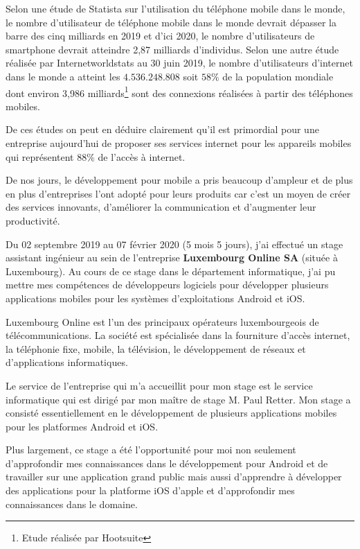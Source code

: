 	Selon une étude de Statista sur l'utilisation du téléphone mobile dans le monde, le nombre d'utilisateur de téléphone mobile dans le monde devrait dépasser la barre des cinq milliards en 2019 et d'ici 2020, le nombre d'utilisateurs de smartphone devrait atteindre 2,87 milliards d'individus. Selon une autre étude réalisée par \og Internetworldstats \fg{,}  au 30 juin 2019, le nombre d'utilisateurs d'internet dans le monde a atteint les $4.536.248.808$ soit $58 \% $ de la population mondiale dont environ 3,986 milliards\footnote{Etude réalisée par Hootsuite} sont des connexions réalisées à partir des téléphones mobiles.
	
	De ces études on peut en déduire clairement qu'il est primordial pour une entreprise aujourd'hui de proposer ses services internet pour les appareils mobiles  qui  représentent $88\% $ de l'accès à internet. 
	
	De nos jours, le développement pour mobile a pris beaucoup d'ampleur  et de plus en plus d'entreprises l'ont adopté pour leurs produits car c'est un moyen de créer des services innovants, d'améliorer la communication et d'augmenter leur productivité.
	
	Du 02 septembre 2019 au 07 février 2020 (5 mois 5 jours), j'ai effectué un stage assistant ingénieur au sein de l'entreprise \textbf{Luxembourg Online SA} (située à Luxembourg). Au cours de ce stage dans le département informatique, j'ai pu mettre mes compétences de développeurs logiciels pour développer plusieurs applications mobiles pour les systèmes d'exploitations \gls{Android} et \gls{iOS}.
	
	Luxembourg Online est l'un des principaux opérateurs luxembourgeois de télécommunications. La société est spécialisée dans la fourniture d'accès internet, la téléphonie fixe, mobile, la télévision, le développement de réseaux et d'applications informatiques.
	
	Le service de l'entreprise qui m'a accueillit pour mon stage est le service informatique qui est dirigé par mon maître de stage M. Paul Retter. Mon stage a consisté essentiellement en le développement de plusieurs applications mobiles pour les platformes Android et iOS.
	
	Plus largement, ce stage a été l'opportunité pour moi non seulement d'approfondir mes connaissances dans le développement pour Android et de travailler sur une application grand public mais aussi d'apprendre à développer des applications pour la platforme iOS d'apple et d'approfondir mes connaissances dans le domaine.
	

